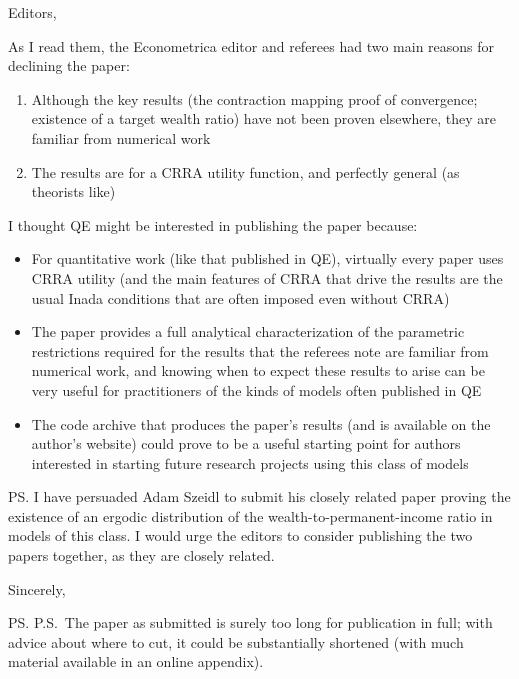 \documentclass[12pt]{letter}
\begin{document}
Editors,

As I read them, the Econometrica editor and referees had two main reasons for declining the paper:
\begin{enumerate}
\item Although the key results (the contraction mapping proof of convergence; existence of a target wealth ratio) have not been proven elsewhere, they are familiar from numerical work

\item The results are for a CRRA utility function, and perfectly general (as theorists like)
\end{enumerate}

I thought QE might be interested in publishing the paper because:
\begin{itemize}
\item For quantitative work (like that published in QE), virtually
  every paper uses CRRA utility (and the main features of
  CRRA that drive the results are the usual Inada conditions that are
  often imposed even without CRRA)
\item The paper provides a full analytical characterization of the parametric restrictions required for the results that the referees note are familiar from numerical work, and knowing when to expect these results to arise can be very useful for practitioners of the kinds of models often published in QE
\item The code archive that produces the paper's results (and is available on the author's website) could prove to be a useful starting point for authors interested in starting future research projects using this class of models
\end{itemize}

PS.  I have persuaded Adam Szeidl to submit his closely related paper proving the existence of an ergodic distribution of the wealth-to-permanent-income ratio in models of this class.  I would urge the editors to consider publishing the two papers together, as they are closely related.  

\closing{Sincerely,}

\ps{P.S.\  The paper as submitted is surely too long for publication in
  full; with advice about where to cut, it could be substantially shortened (with much material available in an online appendix).}
\end{document}

